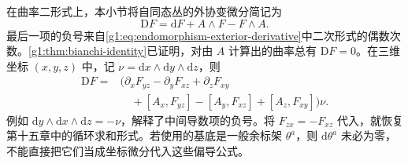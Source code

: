 \ProseParagraphBreak

在曲率二形式上，本小节将自同态丛的外协变微分简记为
\[
	\mathrm{D}F=\mathrm{d}F+A\wedge F-F\wedge A.
\]
最后一项的负号来自\eqref{g1:eq:endomorphism-exterior-derivative}中二次形式的偶数次数。\cref{g1:thm:bianchi-identity}已证明，对由 \(A\) 计算出的曲率总有 \(\mathrm{D}F=0\)。在三维坐标 \((x,y,z)\) 中，记 \(\nu=\mathrm{d}x\wedge\mathrm{d}y\wedge\mathrm{d}z\)，则
\begin{equation}\label{g1:eq:connection-check-bianchi-coefficient}
	\begin{aligned}
		\mathrm{D}F
		={}&\bigl(\partial_xF_{yz}-\partial_yF_{xz}+\partial_zF_{xy}\\
		&\quad+[A_x,F_{yz}]-[A_y,F_{xz}]+[A_z,F_{xy}]\bigr)\nu.
	\end{aligned}
\end{equation}
例如 \(\mathrm{d}y\wedge\mathrm{d}x\wedge\mathrm{d}z=-\nu\)，解释了中间导数项的负号。将 \(F_{zx}=-F_{xz}\) 代入，就恢复第十五章中的循环求和形式。若使用的基底是一般余标架 \(\theta^a\)，则 \(\mathrm{d}\theta^a\) 未必为零，不能直接把它们当成坐标微分代入这些偏导公式。

